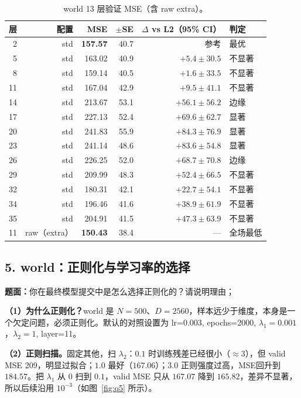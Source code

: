 \documentclass[UTF8,a4paper]{ctexart}
\begin{document}
\begin{table}[htbp]
  \centering
  \small
  \begin{tabular}{rrrrrl}
    \toprule
    层 & 配置 & MSE & $\pm$SE & $\Delta$ vs L2（95\% CI） & 判定 \\
    \midrule
    2 & std & \textbf{157.57} & 40.7 & 参考 & 最优 \\
    5 & std & 163.02 & 40.9 & $+5.4\pm30.5$ & 不显著 \\
    8 & std & 159.14 & 40.5 & $+1.6\pm33.5$ & 不显著 \\
    11 & std & 167.04 & 42.9 & $+9.5\pm41.1$ & 不显著 \\
    14 & std & 213.67 & 53.1 & $+56.1\pm56.2$ & 边缘 \\
    17 & std & 227.13 & 52.4 & $+69.6\pm62.7$ & 显著 \\
    20 & std & 241.83 & 55.9 & $+84.3\pm76.9$ & 显著 \\
    23 & std & 241.14 & 48.6 & $+83.6\pm54.8$ & 显著 \\
    26 & std & 226.25 & 52.0 & $+68.7\pm70.8$ & 边缘 \\
    29 & std & 209.99 & 48.3 & $+52.4\pm66.5$ & 不显著 \\
    32 & std & 180.31 & 42.1 & $+22.7\pm54.1$ & 不显著 \\
    34 & std & 196.46 & 41.6 & $+38.9\pm61.9$ & 不显著 \\
    35 & std & 204.91 & 41.5 & $+47.3\pm63.9$ & 不显著 \\
    11 & raw（extra） & \textbf{150.43} & 38.4 & — & 全场最低 \\
    \bottomrule
  \end{tabular}
  \caption{world 13 层验证 MSE（含 raw extra）。}\label{tab:q4}
\end{table}


\FloatBarrier
\subsection*{5. world：正则化与学习率的选择}

\textbf{题面：}你在最终模型提交中是怎么选择正则化的？请说明理由；

\textbf{（1）为什么正则化？}world 是 $N=500$、$D=2560$，样本远少于维度，本身是一个欠定问题，必须正则化。默认的对照设置为 lr=0.003, epochs=2000, $\lambda_1 =0.001$，$\lambda_2=1$, layer=11。

\textbf{（2）正则扫描。}固定其他，扫 $\lambda_2$：$0.1$ 时训练残差已经很小（$\approx3$），但 valid MSE 209，明显过拟合；$1.0$ 最好（$167.06$）；$3.0$ 正则强度过高，MSE回升到 $184.57$。把 $\lambda_1$ 从 $0$ 扫到 $0.1$，valid MSE 只从 $167.07$ 降到 $165.82$，差异不显著，所以后续沿用 $10^{-3}$（如图~\ref{fig:q5} 所示）。
\end{document}
